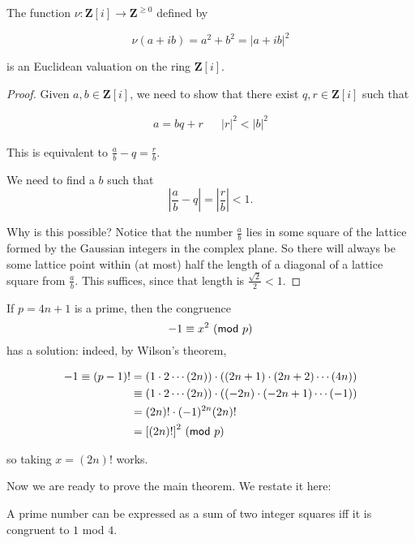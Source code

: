 \begin{prop}
  The function \(\nu: {\mathbf Z}[i]\to{\mathbf Z}^{\geq 0}\) defined by

  \[ \nu(a + ib) = a^2 + b^2 = | a + ib |^2 \]

  is an Euclidean valuation on the ring \({\mathbf Z}[i]\).
\end{prop}

\begin{proof}
  Given \(a,b\in{\mathbf Z}[i]\), we need to show that there exist
  \(q,r\in{\mathbf Z}[i]\) such that

  \begin{align}a=bq+r &&|r|^2 < |b|^2\end{align}

  This is equivalent to \(\frac ab - q = \frac r b.\)

  We need to find a \(b\) such that
  \[\left|\frac ab - q\right| = \left| \frac rb\right|< 1.\]

  Why is this possible? Notice that the number \(\frac ab\) lies in some square
  of the lattice formed by the Gaussian integers in the complex plane. So there
  will always be some lattice point within (at most) half the length of a
  diagonal of a lattice square from \(\frac ab\). This suffices, since that
  length is \(\frac{\sqrt 2}2 < 1\).
\end{proof}
If \(p=4n+1\) is a prime, then the congruence \[-1\equiv x^2\ (\mathsf{mod}\ p)\] has a
solution: indeed, by Wilson's theorem,

\begin{align}
  -1\equiv (p-1)! &= (1\cdot2\cdots{(2n)})\cdot((2n+1)\cdot(2n+2)\cdots{(4n)}) \\
                  &\equiv (1\cdot2\cdots{(2n)})\cdot((-2n)\cdot(-2n+1)\cdots{(-1)}) \\
                  &= (2n)!\cdot{(-1)^{2n}(2n)!} \\
                  &= {[(2n)!]}^2 \ (\mathsf{mod}\ p)
\end{align}

so taking \(x=(2n)!\) works.

Now we are ready to prove the main theorem. We restate it here:

\begin{theorem}[Fermat]
  A prime number can be expressed as a sum of two integer squares iff it is
  congruent to \(1\) mod \(4\).
\end{theorem}

